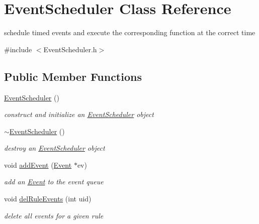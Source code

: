 \hypertarget{classEventScheduler}{}\section{Event\+Scheduler Class Reference}
\label{classEventScheduler}


schedule timed events and execute the corresponding function at the correct time  




{\ttfamily \#include $<$Event\+Scheduler.\+h$>$}

\subsection*{Public Member Functions}
\begin{DoxyCompactItemize}
\item 
\mbox{\label{classEventScheduler_a5d0af0bdbbb5948ab06075ef12fc8aa0}} 
\hyperlink{classEventScheduler_a5d0af0bdbbb5948ab06075ef12fc8aa0}{Event\+Scheduler} ()
\begin{DoxyCompactList}\small\item\em construct and initialize an \hyperlink{classEventScheduler}{Event\+Scheduler} object \end{DoxyCompactList}\item 
\mbox{\label{classEventScheduler_a30d88ffd8a9c7956947ccf0dc58e20ac}} 
\hyperlink{classEventScheduler_a30d88ffd8a9c7956947ccf0dc58e20ac}{$\sim$\+Event\+Scheduler} ()
\begin{DoxyCompactList}\small\item\em destroy an \hyperlink{classEventScheduler}{Event\+Scheduler} object \end{DoxyCompactList}\item 
void \hyperlink{classEventScheduler_aa0ece0b48922f1712e0d1057841e1c0f}{add\+Event} (\hyperlink{classEvent}{Event} $\ast$ev)
\begin{DoxyCompactList}\small\item\em add an \hyperlink{classEvent}{Event} to the event queue \end{DoxyCompactList}\item 
void \hyperlink{classEventScheduler_a2f6d1f0ef1f8ef3b073f99ae9ecc1f35}{del\+Rule\+Events} (int uid)
\begin{DoxyCompactList}\small\item\em delete all events for a given rule \end{DoxyCompactList}\item 

\end{DoxyCompactItemize}
